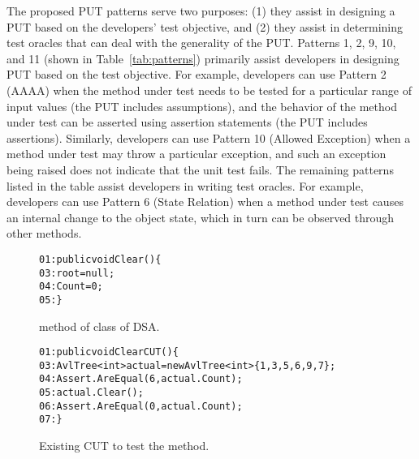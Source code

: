 The proposed PUT patterns serve two purposes: (1) they assist in designing a PUT based on the developers' test objective, and (2) they assist in determining test oracles that can deal with the generality of the PUT. Patterns 1, 2, 9, 10, and 11 (shown in Table~\ref{tab:patterns}) primarily assist developers in designing PUT based on the test objective. For example, developers can use Pattern 2 (AAAA) when the method under test needs to be tested for a particular range of input values (the PUT includes assumptions), and the behavior of the method under test can be asserted using assertion statements (the PUT includes assertions). Similarly, developers can use Pattern 10 (Allowed Exception) when a method under test may throw a particular exception, and such an exception being raised does not indicate that the unit test fails. 
The remaining patterns listed in the table assist developers in writing test oracles. For example, developers can use Pattern 6 (State Relation) when a method under test causes an internal change to the object state, which in turn can be observed through other methods. 

\begin{figure}
\begin{CodeOut}        
\begin{alltt}
01: public void Clear() \{
03: \hspace{0.07in}root = null;
04: \hspace{0.07in}Count = 0;
05: \}
\end{alltt}        
\end{CodeOut}\vspace*{-4ex}
\caption{ method of  class of DSA.}
\label{fig:pattern}%

\begin{CodeOut}        
\begin{alltt}
01: public void ClearCUT() \{
03: \hspace{0.07in}AvlTree<int> actual = new AvlTree<int>\{1,3,5,6,9,7\};
04: \hspace{0.07in}Assert.AreEqual(6, actual.Count);
05: \hspace{0.07in}actual.Clear();
06: \hspace{0.07in}Assert.AreEqual(0, actual.Count);            
07: \}
\end{alltt}
\end{CodeOut}\vspace*{-4ex}
\caption{Existing CUT to test the  method.}%
\label{fig:patternCUT}%
\end{figure}

